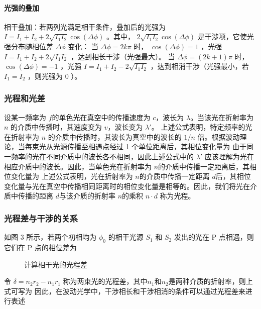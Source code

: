\documentclass{ctexart}
\begin{document}
\paragraph{光强的叠加}
相干叠加：若两列光满足相干条件，叠加后的光强为 $I = I_1 + I_2 + 2 \sqrt{I_1 I_2} \cos(\Delta \phi)$ 。其中， $2 \sqrt{I_1 I_2} \cos(\Delta \phi)$ 是干涉项，它使光强分布随相位差 $\Delta \phi$ 变化：
当 $\Delta \phi = 2k\pi$ 时， $\cos(\Delta \phi) = 1$ ，光强 $I = I_1 + I_2 + 2 \sqrt{I_1 I_2}$ ，达到相长干涉（光强最大）。
当 $\Delta \phi = (2k+1)\pi$ 时， $\cos(\Delta \phi) = -1$ ，光强 $I = I_1 + I_2 - 2 \sqrt{I_1 I_2}$ ，达到相消干涉（光强最小，若 $I_1 = I_2$ ，则光强为 $0$ ）。

\subsubsection{光程和光差}
设某一频率为 $f$的单色光在真空中的传播速度为 $c$，波长为 $\lambda$。当该光在折射率为 $n$ 的介质中传播时，其速度变为 $v$，波长变为 $\lambda'$。
上述公式表明，特定频率的光在折射率为 $n$ 的介质中传播时，其波长为真空中的波长的 $1/n$ 倍。根据波动理论，当每束光从光源传播至相遇点经过 1 个单位距离后，其相位变化量为
由于同一频率的光在不同介质中的波长各不相同，因此上述公式中的 $\lambda'$ 应该理解为光在相应介质中的波长。因此，当单色光在折射率为 $n$的介质中传播一定距离后，其相位变化量为
上述公式表明，光在折射率为 $n$的介质中传播一定距离 $d$后，其相位变化量与光在真空中传播相同距离时的相位变化量是相等的。因此，我们将光在介质中传播的距离 $d$与该介质的折射率 $n$的乘积 $n\cdot d$ 称为光程。

\subsubsection{光程差与干涉的关系}
如图 3 所示，若两个初相均为 $\phi_0$ 的相干光源 $S_1$ 和 $S_2$ 发出的光在 P 点相遇，则它们在 P 点的相位差为
\begin{figure}[ht]
    \centering
    \fbox{\rule{2cm}{0pt} \rule{0pt}{2cm}} %
    \caption{计算相干光的光程差}
    \label{fig:3}
\end{figure}
令 $\delta = n_2 r_2 - n_1 r_1$ 称为两束光的光程差，其中$n_1$和$n_2$是两种介质的折射率，则上式可写为
因此，在波动光学中，干涉相长和干涉相消的条件可以通过光程差来进行表述
\end{document}
